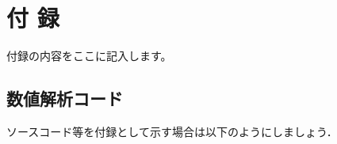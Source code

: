 \chapter*{付 録}
    付録の内容をここに記入します。
    
        \section{数値解析コード}
        ソースコード等を付録として示す場合は以下のようにしましょう．
        